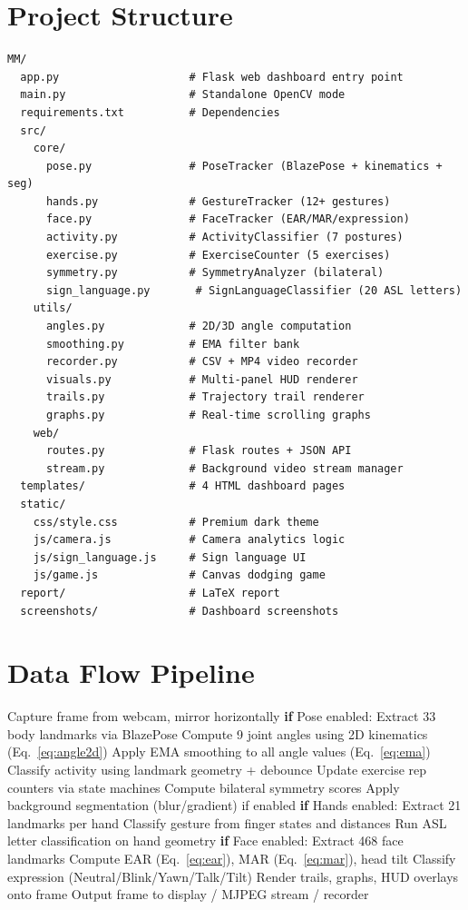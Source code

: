 \documentclass[a4paper,12pt]{report}
\begin{document}
\section{Project Structure}
\begin{lstlisting}[caption=Complete Project File Structure, label=lst:structure]
MM/
  app.py                    # Flask web dashboard entry point
  main.py                   # Standalone OpenCV mode
  requirements.txt          # Dependencies
  src/
    core/
      pose.py               # PoseTracker (BlazePose + kinematics + seg)
      hands.py              # GestureTracker (12+ gestures)
      face.py               # FaceTracker (EAR/MAR/expression)
      activity.py           # ActivityClassifier (7 postures)
      exercise.py           # ExerciseCounter (5 exercises)
      symmetry.py           # SymmetryAnalyzer (bilateral)
      sign_language.py       # SignLanguageClassifier (20 ASL letters)
    utils/
      angles.py             # 2D/3D angle computation
      smoothing.py          # EMA filter bank
      recorder.py           # CSV + MP4 video recorder
      visuals.py            # Multi-panel HUD renderer
      trails.py             # Trajectory trail renderer
      graphs.py             # Real-time scrolling graphs
    web/
      routes.py             # Flask routes + JSON API
      stream.py             # Background video stream manager
  templates/                # 4 HTML dashboard pages
  static/
    css/style.css           # Premium dark theme
    js/camera.js            # Camera analytics logic
    js/sign_language.js     # Sign language UI
    js/game.js              # Canvas dodging game
  report/                   # LaTeX report
  screenshots/              # Dashboard screenshots
\end{lstlisting}

\section{Data Flow Pipeline}

\begin{algorithm}[H]
\caption{Main Analysis Loop (per frame)}
\begin{algorithmic}[1]
\STATE Capture frame from webcam, mirror horizontally
\STATE \textbf{if} Pose enabled: Extract 33 body landmarks via BlazePose
\STATE Compute 9 joint angles using 2D kinematics (Eq.~\ref{eq:angle2d})
\STATE Apply EMA smoothing to all angle values (Eq.~\ref{eq:ema})
\STATE Classify activity using landmark geometry + debounce
\STATE Update exercise rep counters via state machines
\STATE Compute bilateral symmetry scores
\STATE Apply background segmentation (blur/gradient) if enabled
\STATE \textbf{if} Hands enabled: Extract 21 landmarks per hand
\STATE Classify gesture from finger states and distances
\STATE Run ASL letter classification on hand geometry
\STATE \textbf{if} Face enabled: Extract 468 face landmarks
\STATE Compute EAR (Eq.~\ref{eq:ear}), MAR (Eq.~\ref{eq:mar}), head tilt
\STATE Classify expression (Neutral/Blink/Yawn/Talk/Tilt)
\STATE Render trails, graphs, HUD overlays onto frame
\STATE Output frame to display / MJPEG stream / recorder
\end{algorithmic}
\end{algorithm}
\end{document}
